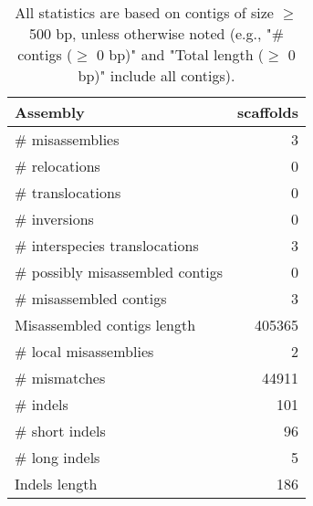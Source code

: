 \documentclass[12pt,a4paper]{article}
\begin{document}
\begin{table}[ht]
\begin{center}
\caption{All statistics are based on contigs of size $\geq$ 500 bp, unless otherwise noted (e.g., "\# contigs ($\geq$ 0 bp)" and "Total length ($\geq$ 0 bp)" include all contigs).}
\begin{tabular}{|l*{1}{|r}|}
\hline
Assembly & scaffolds \\ \hline
\# misassemblies & 3 \\ \hline
\hspace{5mm}\# relocations & 0 \\ \hline
\hspace{5mm}\# translocations & 0 \\ \hline
\hspace{5mm}\# inversions & 0 \\ \hline
\hspace{5mm}\# interspecies translocations & 3 \\ \hline
\# possibly misassembled contigs & 0 \\ \hline
\# misassembled contigs & 3 \\ \hline
Misassembled contigs length & 405365 \\ \hline
\# local misassemblies & 2 \\ \hline
\# mismatches & 44911 \\ \hline
\# indels & 101 \\ \hline
\hspace{5mm}\# short indels & 96 \\ \hline
\hspace{5mm}\# long indels & 5 \\ \hline
Indels length & 186 \\ \hline
\end{tabular}
\end{center}
\end{table}
\end{document}
